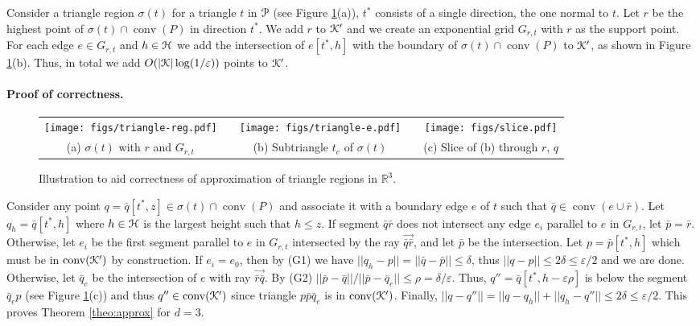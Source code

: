 \documentclass[11pt]{myclass}
\newcommand{\eps}{\varepsilon}
\renewcommand{\c}[1]{\ensuremath{\EuScript{#1}}}
\renewcommand{\b}[1]{\ensuremath{\mathbb{#1}}}
\def\kernel{\EuScript{K}}
\newcommand{\conv}[1]{\mathop{\mathrm{conv}}(#1)}
\newcommand{\dual}[1]{{#1}^*}
\newcommand{\polyt}{\EuScript{P}}
\newcommand{\fp}{\bar{p}}
\newcommand{\fq}{\bar{q}}
\newcommand{\fr}{\bar{r}}
\newcommand{\point}[3]{{#1}[#3,#2]}
\begin{document}
Consider a triangle region $\sigma(t)$ for a triangle $t$ in $\polyt$ (see Figure \ref{fig:correct-triangle}(a)), $\dual{t}$ consists of a single direction, the one normal to $t$. 
Let $r$ be the highest point of $\sigma(t) \cap \conv{P}$ in direction $\dual{t}$.  We add $r$ to $\kernel'$ and we create an exponential grid $G_{r,t}$ with $r$ as the support point.
For each edge $e \in G_{r,t}$ and $h \in \c{H}$ we add the intersection of $\point{e}{h}{t^*}$ with the boundary of $\sigma(t) \cap \conv{P}$ to $\kernel'$, as shown in Figure \ref{fig:correct-triangle}(b).  
Thus, in total we add $O(|\kernel| \log (1/\eps))$ points to $\kernel'$.



\paragraph{Proof of correctness.}


\begin{figure}[htb!]
\begin{center}
{\small 
\begin{tabular}{ccccc}
\texttt{[image: figs/triangle-reg.pdf]} 
& \hspace{0.1cm} & 
\texttt{[image: figs/triangle-e.pdf]} 
& \hspace{0.1cm} & 
\texttt{[image: figs/slice.pdf]}
\\
(a) $\sigma(t)$ with $r$ and $G_{r,t}$ && (b) Subtriangle $t_e$ of $\sigma(t)$  && (c) Slice of (b) through $r$, $q$
\end{tabular}
}
\end{center}
\caption{Illustration to aid correctness of approximation of triangle regions in $\b{R}^3$.}
\label{fig:correct-triangle}
\end{figure}



Consider any point $q = \point{\fq}{z}{t^*} \in \sigma(t) \cap \conv{P}$ and associate it with a boundary edge $e$ of $t$ such that $\fq \in \conv{e \cup \fr}$.  Let $q_h = \point{\fq}{h}{t^*}$ where $h \in \c{H}$ is the largest height such that $h \leq z$.  
If segment $\fq \fr$ does not intersect any edge $e_i$ parallel to $e$ in $G_{r,t}$, let $\fp = \fr$.  
Otherwise, let $e_i$ be the first segment parallel to $e$ in $G_{r,t}$ intersected by the ray $\overrightarrow{\fq \fr}$, and let $\fp$ be the intersection.  
Let $p = \point{\fp}{h}{t^*}$ which must be in $\conv{\kernel'}$ by construction.  
If $e_i = e_0$, then by (G1) we have $||q_h - p|| = ||\fq - \fp|| \leq \delta$, thus $||q - p|| \leq 2\delta \leq \eps/2$ and we are done.  
Otherwise, let $\fq_e$ be the intersection of $e$ with ray $\overrightarrow{\fr \fq}$.  By (G2) $||\fp - \fq||/||\fp - \fq_e|| \leq \rho = \delta/\eps$.  Thus, $q'' = \point{\fq}{h-\eps\rho}{t^*}$ is below the segment $\fq_e p$ (see Figure \ref{fig:correct-triangle}(c)) and thus $q'' \in \conv{\kernel'}$ since triangle $p \fp \fq_e$ is in $\conv{\kernel'}$.  Finally, $||q - q''|| = ||q - q_h|| + ||q_h - q''|| \leq 2\delta \leq \eps/2$.  
This proves Theorem \ref{theo:approx} for $d=3$.  
\end{document}
